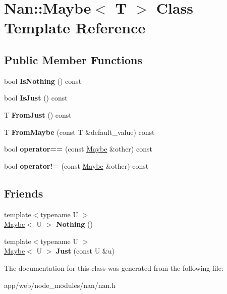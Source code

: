 \hypertarget{class_nan_1_1_maybe}{}\section{Nan\+:\+:Maybe$<$ T $>$ Class Template Reference}
\label{class_nan_1_1_maybe}
\subsection*{Public Member Functions}
\begin{DoxyCompactItemize}
\item 
\mbox{\label{class_nan_1_1_maybe_af9474d01706fbacdc5864b60d4342ab0}} 
bool {\bfseries Is\+Nothing} () const
\item 
\mbox{\label{class_nan_1_1_maybe_aecb755aedd7a37c07943bf65b22364d3}} 
bool {\bfseries Is\+Just} () const
\item 
\mbox{\label{class_nan_1_1_maybe_a4039f29c1812c86d7669ecdf18809c2e}} 
T {\bfseries From\+Just} () const
\item 
\mbox{\label{class_nan_1_1_maybe_af3e8e3dd44b4ef7e669cb6dc878e693f}} 
T {\bfseries From\+Maybe} (const T \&default\+\_\+value) const
\item 
\mbox{\label{class_nan_1_1_maybe_a537c273d07f71108448b8ae0766c0446}} 
bool {\bfseries operator==} (const \hyperlink{class_nan_1_1_maybe}{Maybe} \&other) const
\item 
\mbox{\label{class_nan_1_1_maybe_af565304dc549839402096e1d83bb55c2}} 
bool {\bfseries operator!=} (const \hyperlink{class_nan_1_1_maybe}{Maybe} \&other) const
\end{DoxyCompactItemize}
\subsection*{Friends}
\begin{DoxyCompactItemize}
\item 
\mbox{\label{class_nan_1_1_maybe_aeb9593e125b42d748acbd69b72c89f37}} 
{\footnotesize template$<$typename U $>$ }\\\hyperlink{class_nan_1_1_maybe}{Maybe}$<$ U $>$ {\bfseries Nothing} ()
\item 
\mbox{\label{class_nan_1_1_maybe_aeff0e7fedd63cfebe9a5286e2cd8552d}} 
{\footnotesize template$<$typename U $>$ }\\\hyperlink{class_nan_1_1_maybe}{Maybe}$<$ U $>$ {\bfseries Just} (const U \&u)
\end{DoxyCompactItemize}


The documentation for this class was generated from the following file\+:\begin{DoxyCompactItemize}
\item 
app/web/node\+\_\+modules/nan/nan.\+h\end{DoxyCompactItemize}
